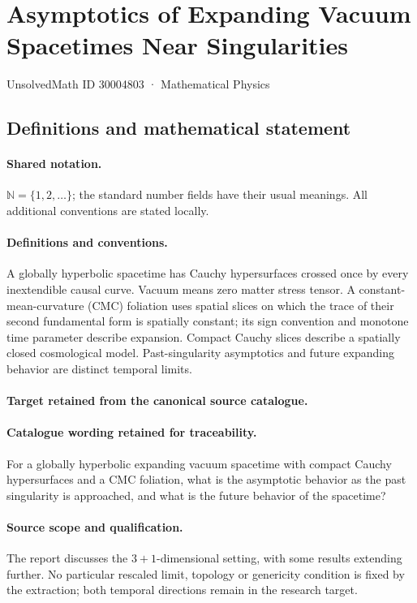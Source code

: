 \documentclass[11pt]{article}
\begin{document}
\setcounter{section}{30004802}
\section{Asymptotics of Expanding Vacuum Spacetimes Near Singularities}\label{30004803}
{\small UnsolvedMath ID 30004803 · Mathematical Physics}
\subsection{Definitions and mathematical statement}

\paragraph{Shared notation.}$\mathbb N=\{1,2,\ldots\}$; the standard number fields have their usual meanings. All additional conventions are stated locally.


\paragraph{Definitions and conventions.}
A globally hyperbolic spacetime has Cauchy hypersurfaces crossed once by every inextendible causal curve. Vacuum means zero matter stress tensor. A constant-mean-curvature (CMC) foliation uses spatial slices on which the trace of their second fundamental form is spatially constant; its sign convention and monotone time parameter describe expansion. Compact Cauchy slices describe a spatially closed cosmological model. Past-singularity asymptotics and future expanding behavior are distinct temporal limits.

\paragraph{Target retained from the canonical source catalogue.}
\paragraph{Catalogue wording retained for traceability.}
For a globally hyperbolic expanding vacuum spacetime with compact Cauchy hypersurfaces and a CMC foliation, what is the asymptotic behavior as the past singularity is approached, and what is the future behavior of the spacetime?

\paragraph{Source scope and qualification.}
The report discusses the $3+1$-dimensional setting, with some results extending further. No particular rescaled limit, topology or genericity condition is fixed by the extraction; both temporal directions remain in the research target.
\end{document}
